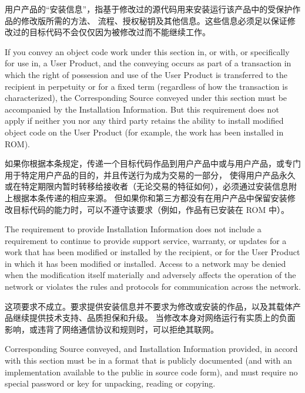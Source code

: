\documentclass[11pt]{article}
\begin{document}
\begin{enumerate}
        用户产品的“安装信息”，指基于修改过的源代码用来安装运行该产品中的受保护作品的修改版所需的方法、
        流程、授权秘钥及其他信息。这些信息必须足以保证修改过的目标代码不会仅仅因为被修改过而不能继续工作。

        If you convey an object code work under this section in, or with, or
        specifically for use in, a User Product, and the conveying occurs as
        part of a transaction in which the right of possession and use of the
        User Product is transferred to the recipient in perpetuity or for a
        fixed term (regardless of how the transaction is characterized), the
        Corresponding Source conveyed under this section must be accompanied
        by the Installation Information.  But this requirement does not apply
        if neither you nor any third party retains the ability to install
        modified object code on the User Product (for example, the work has
        been installed in ROM).

        如果你根据本条规定，传递一个目标代码作品到用户产品中或与用户产品，或专门用于特定用户产品的目的，并且传送行为成为交易的一部分，
        使得用户产品永久或在特定期限内暂时转移给接收者（无论交易的特征如何），必须通过安装信息附上根据本条传递的相应来源。
        但如果你和第三方都没有在用户产品中保留安装修改目标代码的能力时，可以不遵守该要求（例如，作品有已安装在 ROM 中）。

        The requirement to provide Installation Information does not include a
        requirement to continue to provide support service, warranty, or updates
        for a work that has been modified or installed by the recipient, or for
        the User Product in which it has been modified or installed.  Access to a
        network may be denied when the modification itself materially and
        adversely affects the operation of the network or violates the rules and
        protocols for communication across the network.

        这项要求不成立。要求提供安装信息并不要求为修改或安装的作品，以及其载体产品继续提供技术支持、品质担保和升级。
        当修改本身对网络运行有实质上的负面影响，或违背了网络通信协议和规则时，可以拒绝其联网。

        Corresponding Source conveyed, and Installation Information provided,
        in accord with this section must be in a format that is publicly
        documented (and with an implementation available to the public in
        source code form), and must require no special password or key for
        unpacking, reading or copying.


\end{enumerate}
\end{document}
